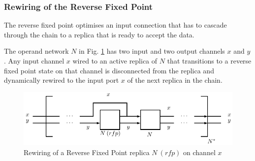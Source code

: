 %
%
%
%
%
%
%


    \subsubsection{Rewiring of the Reverse Fixed Point}
The reverse fixed point optimises an input connection that has to cascade through the chain to a replica that is ready to accept the data.

The operand network $N$ in Fig. \ref{fig:rfp_wiring} has two input and two output channels $x$ and $y$. Any input channel $x$ wired to an active replica of $N$ that transitions to a reverse fixed point state on that channel is disconnected from the replica and dynamically rewired to the input port $x$ of the next replica in the chain.
\begin{figure}[h!]
\centering
\includegraphics[scale=0.8]{figs/chapter_04_rfp_wiring.pdf}
\caption{Rewiring of a Reverse Fixed Point replica $N\:(rfp)$ on channel $x$}
\label{fig:rfp_wiring}
\end{figure}

